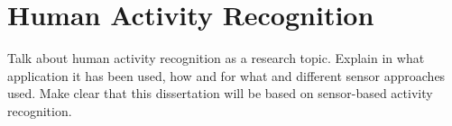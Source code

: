 \section{Human Activity Recognition}
\label{sec:soa:basic}

Talk about human activity recognition as a research topic. Explain in what application it has been used, how and for what and different sensor approaches used. Make clear that this dissertation will be based on sensor-based activity recognition.


